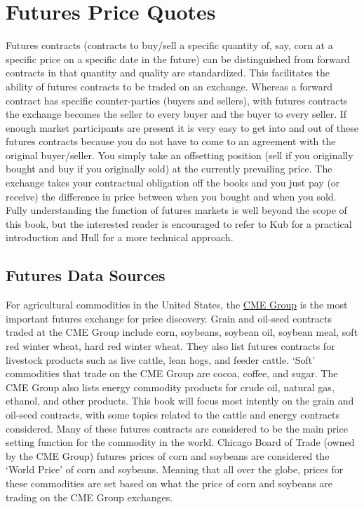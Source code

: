 \documentclass[
]{book}
\begin{document}
\hypertarget{futures-price-quotes}{%
\section{Futures Price Quotes}\label{futures-price-quotes}}

Futures contracts (contracts to buy/sell a specific quantity of, say, corn at a specific price on a specific date in the future) can be distinguished from forward contracts in that quantity and quality are standardized. This facilitates the ability of futures contracts to be traded on an exchange. Whereas a forward contract has specific counter-parties (buyers and sellers), with futures contracts the exchange becomes the seller to every buyer and the buyer to every seller. If enough market participants are present it is very easy to get into and out of these futures contracts because you do not have to come to an agreement with the original buyer/seller. You simply take an offsetting position (sell if you originally bought and buy if you originally sold) at the currently prevailing price. The exchange takes your contractual obligation off the books and you just pay (or receive) the difference in price between when you bought and when you sold. Fully understanding the function of futures markets is well beyond the scope of this book, but the interested reader is encouraged to refer to Kub \citep{kub_mastering_2012} for a practical introduction and Hull \citep{hull_fundamentals_2017} for a more technical approach.

\hypertarget{futures-data-sources}{%
\subsection{Futures Data Sources}\label{futures-data-sources}}

For agricultural commodities in the United States, the \href{http://www.cmegroup.com/}{CME Group} is the most important futures exchange for price discovery. Grain and oil-seed contracts traded at the CME Group include corn, soybeans, soybean oil, soybean meal, soft red winter wheat, hard red winter wheat. They also list futures contracts for livestock products such as live cattle, lean hogs, and feeder cattle. `Soft' commodities that trade on the CME Group are cocoa, coffee, and sugar. The CME Group also lists energy commodity products for crude oil, natural gas, ethanol, and other products. This book will focus most intently on the grain and oil-seed contracts, with some topics related to the cattle and energy contracts considered. Many of these futures contracts are considered to be the main price setting function for the commodity in the world. Chicago Board of Trade (owned by the CME Group) futures prices of corn and soybeans are considered the `World Price' of corn and soybeans. Meaning that all over the globe, prices for these commodities are set based on what the price of corn and soybeans are trading on the CME Group exchanges.
\end{document}
